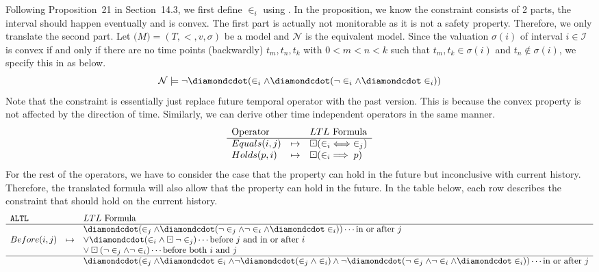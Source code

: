 \documentclass{article}
\begin{document}
\begin{enumerate}
Following Proposition~21 in Section~14.3,
we first define $\in_i$ using \ptLTL.
In the proposition, we know the constraint consists of 2 parts,
the interval should happen eventually and is convex.
The first part is actually not monitorable as it is not a safety property.
Therefore, we only translate the second part.
Let $\mathcal(M) = (T, <, v, \sigma)$ be a \ALTL model and $\mathcal{N}$ is
the equivalent \ptLTL model.
Since the valuation $\sigma(i)$ of interval $i \in \mathcal{I}$ is convex
if and only if there are no time points (backwardly) $t_m, t_n, t_k$ with $0 < m < n < k$
such that $t_m, t_k \in \sigma(i)$ and $t_n \notin \sigma(i)$,
we specify this in \ptLTL as below.
$$
	\mathcal{N} \models \neg \PastF (\in_i \land \PastF( \neg \in_i \land \PastF \in_i))
$$
Note that the constraint is essentially just replace future temporal operator with the past version.
This is because the convex property is not affected by the direction of time.
Similarly, we can derive other time independent \ALTL operators in the same manner.
$$
\begin{array}{lcl}
	\text{Operator} &         & LTL \text{ Formula}       \\ \hline
	Equals(i, j)    & \mapsto & \PastG (\in_i \iff \in_j) \\
	Holds(p, i)     & \mapsto & \PastG (\in_i \implies p) \\
\end{array}
$$
For the rest of the operators, we have to consider the case that the property can
hold in the future but inconclusive with current history.
Therefore, the translated \ptLTL formula will also allow that the property can hold in the future.
In the table below, each row describes the constraint that should hold on the current history.
$$
\begin{array}{lcl}
	\ALTL         &         & LTL \text{ Formula}                                                              \\ \hline
	              &         & \PastF(\in_j\land\PastF(\neg\in_j\land\neg\in_i\land\PastF\in_i)) \cdots \text{in or after $j$} \\
	Before(i, j)  & \mapsto & \lor \PastF (\in_i \land \PastG \neg\in_j) \cdots \text{before $j$ and in or after $i$} \\
	              &         & \lor \PastG (\neg \in_j \land \neg \in_i) \cdots \text{before both $i$ and $j$} \\ \hline
	              &         & \PastF(\in_j\land\PastF\in_i\land\neg\PastF(\in_j\land\in_i)\land\neg\PastF(\neg\in_j\land\neg\in_i\land\PastF\in_i)) \cdots \text{in or after $j$} \\

\end{array}$$
\end{enumerate}
\end{document}
